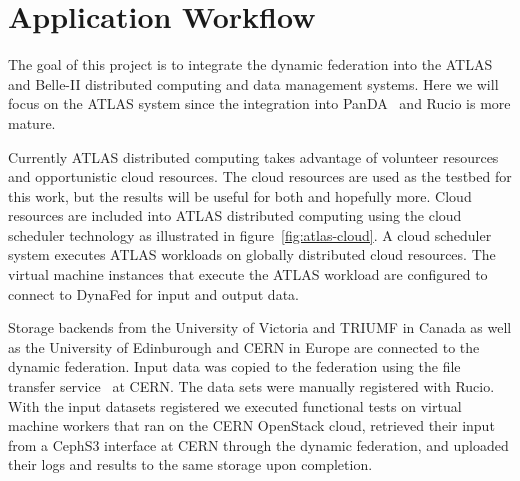 \documentclass[a4paper]{jpconf}
\begin{document}
\section{Application Workflow}
The goal of this project is to integrate the dynamic federation into the ATLAS and Belle-II distributed computing and data management systems. Here we will focus on the ATLAS system since the integration into PanDA~\cite{panda} and Rucio is more mature.

Currently ATLAS distributed computing takes advantage of volunteer resources~\cite{boinc} and opportunistic cloud resources. The cloud resources are used as the testbed for this work, but the results will be useful for both and hopefully more. Cloud resources are included into ATLAS distributed computing using the cloud scheduler technology as illustrated in figure~\ref{fig:atlas-cloud}. A cloud scheduler system executes ATLAS workloads on globally distributed cloud resources. The virtual machine instances that execute the ATLAS workload are configured to connect to DynaFed for input and output data.

Storage backends from the University of Victoria and TRIUMF in Canada as well as the University of Edinburough and CERN in Europe are connected to the dynamic federation. Input data was copied to the federation using the file transfer service~\cite{fts3} at CERN. The data sets were manually registered with Rucio. With the input datasets registered we executed functional tests on virtual machine workers that ran on the CERN OpenStack cloud, retrieved their input from a CephS3 interface at CERN through the dynamic federation, and uploaded their logs and results to the same storage upon completion.
\end{document}
